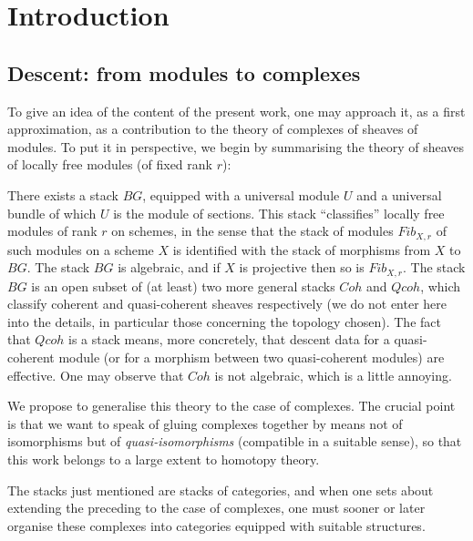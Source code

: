 
\clearpage
\section{Introduction}
\label{intropage}

\subsection*{Descent: from modules to complexes}

To give an idea of the content of the present work, one may approach it, as a
first approximation, as a contribution to the theory of complexes of sheaves
of modules. To put it in perspective, we begin by summarising the theory of
sheaves of locally free modules (of fixed rank $r$):

There exists a stack $BG$, equipped with a universal module $U$ and a
universal bundle of which $U$ is the module of sections. This stack
``classifies'' locally free modules of rank $r$ on schemes, in the sense that
the stack of modules $Fib_{X,r}$ of such modules on a scheme $X$ is identified
with the stack of morphisms from $X$ to $BG$. The stack $BG$ is algebraic, and
if $X$ is projective then so is $Fib_{X,r}$. The stack $BG$ is an open subset
of (at least) two more general stacks $Coh$ and $Qcoh$, which classify
coherent and quasi-coherent sheaves respectively (we do not enter here into
the details, in particular those concerning the topology chosen). The fact
that $Qcoh$ is a stack means, more concretely, that descent data for a
quasi-coherent module (or for a morphism between two quasi-coherent modules)
are effective. One may observe that $Coh$ is not algebraic, which is a little
annoying.

We propose to generalise this theory to the case of complexes. The crucial
point is that we want to speak of gluing complexes together by means not of
isomorphisms but of \emph{quasi-isomorphisms} (compatible in a suitable
sense), so that this work belongs to a large extent to homotopy theory.

The stacks just mentioned are stacks of categories, and when one sets about
extending the preceding to the case of complexes, one must sooner or later
organise these complexes into categories equipped with suitable structures.


